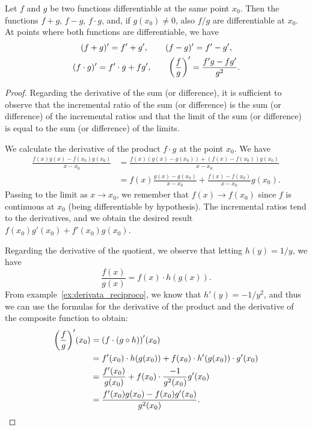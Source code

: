\begin{theorem}
  \label{th:derivate_operazioni}%
\mymark{***}%
Let $f$ and $g$ be two functions differentiable at the same point $x_0$.
Then the functions $f+g$, $f-g$, $f\cdot g$, and, if $g(x_0)\neq 0$, also $f/g$
are differentiable at $x_0$. At points where both functions are differentiable,
we have
\begin{gather*}
  (f+g)' = f' + g', \qquad
  (f-g)' = f' - g', \\
  (f\cdot g)' = f' \cdot g + f g', \qquad
  {\left( \frac{f}{g} \right)}' = \frac{f'g - fg'}{g^2}.
\end{gather*}
\end{theorem}
%
\begin{proof}
\mymark{***}
Regarding the derivative of the sum (or difference), it is sufficient to observe
that the incremental ratio of the sum (or difference) is the sum (or difference)
of the incremental ratios and that the limit of the sum (or difference) is equal
to the sum (or difference) of the limits.

We calculate the derivative of the product $f\cdot g$ at the point $x_0$. We
have
\begin{align*}
  \frac{f(x)g(x) - f(x_0)g(x_0)}{x-x_0}
  &= \frac{f(x)(g(x) - g(x_0)) + (f(x)-f(x_0))g(x_0)}{x-x_0}\\
  &= f(x) \frac{g(x)-g(x_0)}{x-x_0} + \frac{f(x)-f(x_0)}{x-x_0} g(x_0).
\end{align*}
Passing to the limit as $x\to x_0$, we remember that $f(x)\to f(x_0)$ since $f$
is continuous at $x_0$ (being differentiable by hypothesis). The incremental
ratios tend to the derivatives, and we obtain the desired result $f(x_0) g'(x_0)
+ f'(x_0) g(x_0)$.

Regarding the derivative of the quotient, we observe that
letting $h(y)=1/y$, we have
\[
  \frac{f(x)}{g(x)} = f(x) \cdot h(g(x)).
\]
From example~\ref{ex:derivata_reciproco}, we know that $h'(y) = -1/y^2$, and
thus
we can use the formulas for the derivative of the product and the derivative of
the composite function to obtain:
\begin{align*}
  {\left( \frac{f}{g} \right)}'(x_0)
  &= {\left( f \cdot (g\circ h) \right)}'(x_0) \\
  &= f'(x_0) \cdot h(g(x_0)) + f(x_0) \cdot h'(g(x_0))\cdot g'(x_0)\\
  &= \frac{f'(x_0)}{g(x_0)} + f(x_0) \cdot \frac{-1}{g^2(x_0)} g'(x_0)\\
  &= \frac{f'(x_0)g(x_0) - f(x_0)g'(x_0)}{g^2(x_0)}.
\end{align*}
\end{proof}

